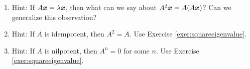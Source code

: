\begin{enumerate}[!HW!, start=1]
\item Hint: If $A\boldsymbol x = \lambda \boldsymbol x$, then what can we say about $A^2\boldsymbol x = A(A\boldsymbol x)$? Can we generalize this observation?

\item Hint: If $A$ is idempotent, then $A^2=A$. Use Exercise \ref{exer:squareeigenvalue}.

\item Hint: If $A$ is nilpotent, then $A^n=0$ for some $n$. Use Exercise \ref{exer:squareeigenvalue}.
\end{enumerate}